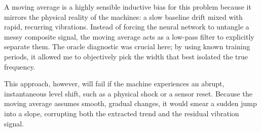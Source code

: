 \documentclass[11pt, a4paper]{article}
\begin{document}
\begin{table}[H]
\centering
{}
\caption{Validation performance ablation: Raw Attention vs. Attention with decomposition.}
\end{table}

A moving average is a highly sensible inductive bias for this problem because it mirrors the physical reality of the machines: a slow baseline drift mixed with rapid, recurring vibrations. Instead of forcing the neural network to untangle a messy composite signal, the moving average acts as a low-pass filter to explicitly separate them. The oracle diagnostic was crucial here; by using known training periods, it allowed me to objectively pick the width that best isolated the true frequency.

This approach, however, will fail if the machine experiences an abrupt, instantaneous level shift, such as a physical shock or a sensor reset. Because the moving average assumes smooth, gradual changes, it would smear a sudden jump into a slope, corrupting both the extracted trend and the residual vibration signal.
\end{document}
